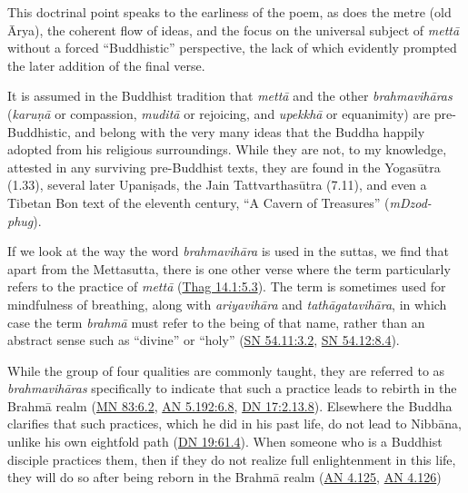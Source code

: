 \documentclass[12pt,openany]{book}%
\begin{document}
This doctrinal point speaks to the earliness of the poem, as does the metre (old Ārya), the coherent flow of ideas, and the focus on the universal subject of \textit{\textsanskrit{mettā}} without a forced “Buddhistic” perspective, the lack of which evidently prompted the later addition of the final verse.

It is assumed in the Buddhist tradition that \textit{\textsanskrit{mettā}} and the other \textit{\textsanskrit{brahmavihāras}} (\textit{\textsanskrit{karuṇā}} or compassion, \textit{\textsanskrit{muditā}} or rejoicing, and \textit{\textsanskrit{upekkhā}} or equanimity) are pre-Buddhistic, and belong with the very many ideas that the Buddha happily adopted from his religious surroundings. While they are not, to my knowledge, attested in any surviving pre-Buddhist texts, they are found in the \textsanskrit{Yogasūtra} (1.33), several later \textsanskrit{Upaniṣads}, the Jain \textsanskrit{Tattvarthasūtra} (7.11), and even a Tibetan Bon text of the eleventh century, “A Cavern of Treasures” (\textit{mDzod-phug}).

If we look at the way the word \textit{\textsanskrit{brahmavihāra}} is used in the suttas, we find that apart from the Mettasutta, there is one other verse where the term particularly refers to the practice of \textit{\textsanskrit{mettā}} (\href{https://suttacentral.net/thag14.1/en/sujato\#5.3}{Thag 14.1:5.3}). The term is sometimes used for mindfulness of breathing, along with \textit{\textsanskrit{ariyavihāra}} and \textit{\textsanskrit{tathāgatavihāra}}, in which case the term \textit{\textsanskrit{brahmā}} must refer to the being of that name, rather than an abstract sense such as “divine” or “holy” (\href{https://suttacentral.net/sn54.11/en/sujato\#3.2}{SN 54.11:3.2}, \href{https://suttacentral.net/sn54.12/en/sujato\#8.4}{SN 54.12:8.4}).

While the group of four qualities are commonly taught, they are referred to as \textit{\textsanskrit{brahmavihāras}} specifically to indicate that such a practice leads to rebirth in the \textsanskrit{Brahmā} realm (\href{https://suttacentral.net/mn83/en/sujato\#6.2}{MN 83:6.2}, \href{https://suttacentral.net/an5.192/en/sujato\#6.8}{AN 5.192:6.8}, \href{https://suttacentral.net/dn17/en/sujato\#2.13.8}{DN 17:2.13.8}). Elsewhere the Buddha clarifies that such practices, which he did in his past life, do not lead to \textsanskrit{Nibbāna}, unlike his own eightfold path (\href{https://suttacentral.net/dn19/en/sujato\#61.4}{DN 19:61.4}). When someone who is a Buddhist disciple practices them, then if they do not realize full enlightenment in this life, they will do so after being reborn in the \textsanskrit{Brahmā} realm (\href{https://suttacentral.net/an4.125/en/sujato}{AN 4.125}, \href{https://suttacentral.net/an4.126/en/sujato}{AN 4.126})
\end{document}
